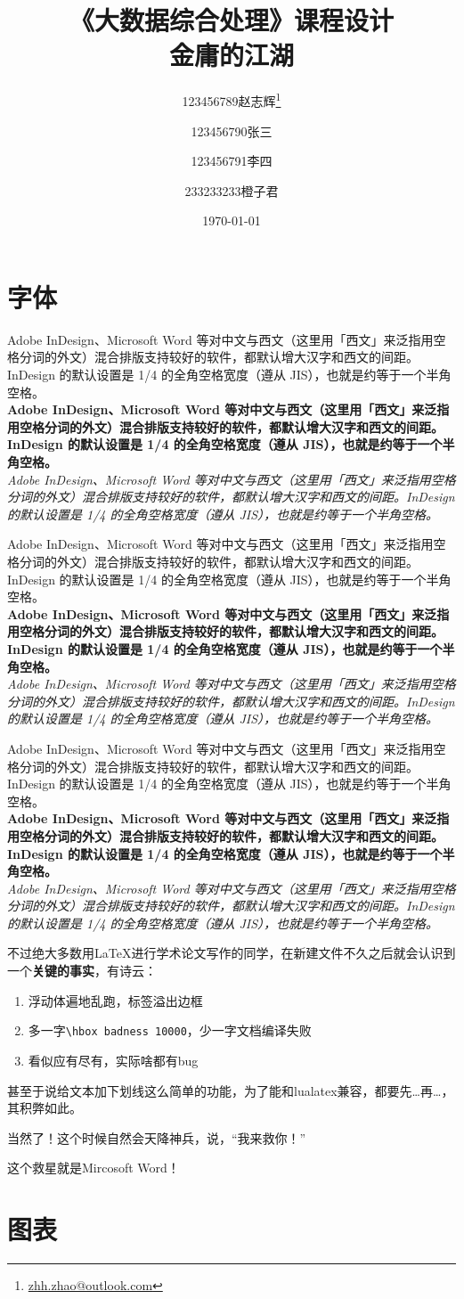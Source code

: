 \documentclass{dreamClass}
\title{
    \vspace{-50pt}
    \textbf{\heiti \Huge《大数据综合处理》课程设计}\\
    \textbf{\heiti \huge 金庸的江湖}
}
\author[1]{123456789赵志辉\thanks{\href{mailto:zhh.zhao@outlook.com}{zhh.zhao@outlook.com}}}
\author[1]{123456790张三}
\author[1]{123456791李四}
\author[2]{233233233橙子君}
\affil[1]{计算机科学与技术系，九乡河文理学院}
\affil[2]{B612星球}
\date{\today}
\begin{document}
\maketitle
\thispagestyle{empty}


\section{字体}

\newcommand{\testtext}{Adobe InDesign、Microsoft Word 等对中文与西文（这里用「西文」来泛指用空格分词的外文）混合排版支持较好的软件，都默认增大汉字和西文的间距。InDesign 的默认设置是 1/4 的全角空格宽度（遵从 JIS），也就是约等于一个半角空格。}

{\rmfamily \testtext \\ \textbf{\testtext} \\ \textit{\testtext} \\}

{\sffamily \testtext \\ \textbf{\testtext} \\ \textit{\testtext} \\}

{\ttfamily \testtext \\ \textbf{\testtext} \\ \textit{\testtext} \\}

\begin{remark}
    不过绝大多数用\LaTeX{}进行学术论文写作的同学，在新建文件不久之后就会认识到一个\textbf{关键的事实}，有诗云：
    \begin{enumerate}
        \item 浮动体遍地乱跑，标签溢出边框
        \item 多一字\verb+\hbox badness 10000+，少一字文档编译失败
        \item 看似应有尽有，实际啥都有bug
    \end{enumerate}
    甚至于说给文本加下划线这么简单的功能，为了能和lualatex兼容，都要先…再…，其积弊如此。

    当然了！这个时候自然会天降神兵，说，“我来救你！”

    这个救星就是Mircosoft\textsuperscript{\small\textregistered} Word！
\end{remark}

\section{图表}\label{sec:1}
\end{document}
